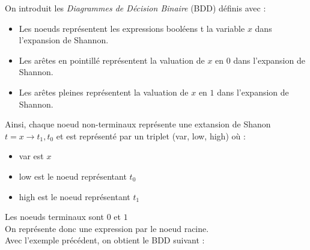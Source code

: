 \documentclass[a4paper, oneside]{report}
\begin{document}
On introduit les \textit{Diagrammes de Décision Binaire} (BDD) définis avec :
\begin{itemize}
\item Les noeuds représentent les expressions booléens t la variable $x$ dans l'expansion de Shannon.
\item Les arêtes en pointillé représentent la valuation de $x$ en $0$ dans l'expansion de Shannon.
\item Les arêtes pleines représentent la valuation de $x$ en $1$ dans l'expansion de Shannon.
\end{itemize}

Ainsi, chaque noeud non-terminaux représente une extansion de Shanon $ t = x \rightarrow t_1, t_0 $ et est représenté par un triplet (var, low, high) où :
\begin{itemize}
\item var est $x$
\item low est le noeud représentant $t_0$
\item high est le noeud représentant $t_1$
\end{itemize}

Les noeuds terminaux sont $0$ et $1$\\

On représente donc une expression par le noeud racine.\\

Avec l'exemple précédent, on obtient le BDD suivant :

\newcommand{\largeur}{0.5\linewidth}
\end{document}
